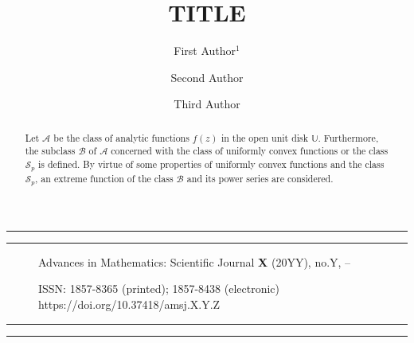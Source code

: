 \documentclass[12pt]{amsart}
\title[\uppercase{short title}]{\uppercase{title}}
\author[F. Author]{First Author$^1$}
\author[S. Author]{Second Author}
\author[T. Author]{Third Author}
\numberwithin{equation}{section}
\numberwithin{definition}{section}
\numberwithin{theorem}{section}
\numberwithin{lemma}{section}
\numberwithin{remark}{section}
\numberwithin{corollary}{section}
\numberwithin{proposition}{section}
\numberwithin{equation}{section}
\begin{document}

\vspace*{-10mm}

\noindent\rule[-4.25mm]{150mm}{1.5pt}

\noindent\rule{150mm}{.7pt}

\vspace{-2.8mm}

\begin{figure}[!h]
\begin{minipage}[c]{30mm}
\vspace{-2mm}
\hspace{1mm}
\end{minipage}
\begin{minipage}[c]{112mm}
\vspace{1mm}
\hspace{.05mm}
\footnotesize{{Advances in Mathematics: Scientific Journal {\bf X} (20YY), no.Y, \thepage--\pageref{lastpage}}}

\hspace*{1mm}\footnotesize{{ISSN: 1857-8365 (printed); 1857-8438 (electronic)}}\\
\hspace*{1mm}\footnotesize{https://doi.org/10.37418/amsj.X.Y.Z} \vspace{2mm}\,\,
\end{minipage}
\end{figure}
\vspace{-10.2mm}

\noindent\rule{150mm}{.7pt}

\noindent\rule[4mm]{150mm}{1.5pt}

\vspace{20mm}



\begin{abstract}
Let $\mathcal{A}$ be the class of analytic  functions $f(z)$ in the open unit disk $\mathbb{U}$. Furthermore, the subclass $\mathcal{B}$ of $\mathcal{A}$ concerned with the class of uniformly convex functions or the class $\mathcal{S}_p$ is defined. By virtue of some properties of uniformly convex functions and the class $\mathcal{S}_p$, an extreme function of the class $\mathcal{B}$ and its power series are considered.
\end{abstract}
\end{document}
